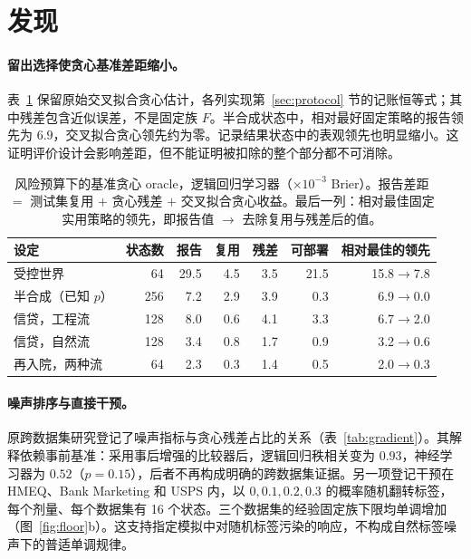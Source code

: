\documentclass[runningheads]{llncs}
\begin{document}
\section{发现}
\label{sec:findings}
\paragraph{留出选择使贪心基准差距缩小。}表~\ref{tab:known} 保留原始交叉拟合贪心估计，各列实现第~\ref{sec:protocol} 节的记账恒等式；其中残差包含近似误差，不是固定族 $F$。半合成状态中，相对最好固定策略的报告领先为 $6.9$，交叉拟合贪心领先约为零。记录结果状态中的表观领先也明显缩小。这证明评价设计会影响差距，但不能证明被扣除的整个部分都不可消除。

\begin{table}[t]
\caption{风险预算下的基准贪心 oracle，逻辑回归学习器（$\times10^{-3}$ Brier）。报告差距 $=$ 测试集复用 $+$ 贪心残差 $+$ 交叉拟合贪心收益。最后一列：相对最佳固定实用策略的领先，即报告值 $\to$ 去除复用与残差后的值。}
\label{tab:known}
\centering\scriptsize
\setlength{\tabcolsep}{3.5pt}
\begin{tabular}{lrrrrrr}
\toprule
设定 & 状态数 & 报告 & 复用 & 残差 & 可部署 & 相对最佳的领先 \\
\midrule
受控世界 & 64 & 29.5 & 4.5 & 3.5 & 21.5 & 15.8$\to$7.8 \\
半合成（已知 $p$） & 256 & 7.2 & 2.9 & 3.9 & 0.3 & 6.9$\to$0.0 \\
信贷，工程流 & 128 & 8.0 & 0.6 & 4.1 & 3.3 & 6.7$\to$2.0 \\
信贷，自然流 & 128 & 3.4 & 0.8 & 1.7 & 0.9 & 3.2$\to$0.6 \\
再入院，两种流 & 64 & 2.3 & 0.3 & 1.4 & 0.5 & 2.0$\to$0.3 \\
\bottomrule
\end{tabular}
\end{table}

\paragraph{噪声排序与直接干预。}原跨数据集研究登记了噪声指标与贪心残差占比的关系（表~\ref{tab:gradient}）。其解释依赖事前基准：采用事后增强的比较器后，逻辑回归秩相关变为 $0.93$，神经学习器为 $0.52$（$p=0.15$），后者不再构成明确的跨数据集证据。另一项登记干预在 HMEQ、Bank Marketing 和 USPS 内，以 $0,0.1,0.2,0.3$ 的概率随机翻转标签，每个剂量、每个数据集有 16 个状态。三个数据集的经验固定族下限均单调增加（图~\ref{fig:floor}b）。这支持指定模拟中对随机标签污染的响应，不构成自然标签噪声下的普适单调规律。
\end{document}
